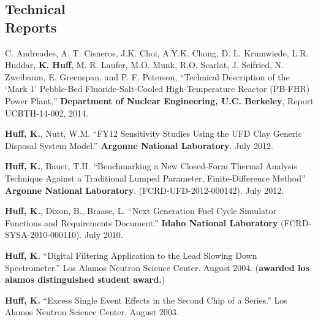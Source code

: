 \documentclass[margin,line]{resume}
\begin{document}
\begin{resume}
    \section{\mysidestyle Technical\\Reports}
    \begin{bibenum}
      \item C. Andreades, A. T. Cisneros, J.K. Choi, A.Y.K. Chong, D. L.
      Krumwiede, L.R. Huddar, \textbf{K. Huff}, M. R. Laufer, M.O. Munk, R.O.
      Scarlat, J. Seifried, N. Zweibaum, E. Greenspan, and P. F. Peterson,
      ``Technical Description of the ‘Mark 1’ Pebble-Bed Fluoride-Salt-Cooled
      High-Temperature Reactor (PB-FHR) Power Plant,'' \textbf{Department of Nuclear
      Engineering, U.C. Berkeley}, Report UCBTH-14-002, 2014.
      \item \textbf{Huff, K.}, Nutt, W.M. ``FY12 Sensitivity Studies Using the UFD Clay Generic Disposal System Model.''
        \textbf{Argonne National Laboratory}. July 2012.
      \item \textbf{Huff, K.}, Bauer, T.H. ``Benchmarking a New Closed-Form Thermal Analysis Technique Against a Traditional
        Lumped Parameter, Finite-Difference Method'' \textbf{Argonne National Laboratory}. (FCRD-UFD-2012-000142). July 2012.
      \item \textbf{Huff, K.}, Dixon, B., Braase, L. ``Next Generation Fuel Cycle Simulator Functions and Requirements Document.''
        \textbf{Idaho National Laboratory} (FCRD-SYSA-2010-000110). July 2010.
      \item \textbf{Huff, K.} ``Digital Filtering Application to the Lead Slowing Down
        Spectrometer.'' Los Alamos Neutron Science Center. August 2004.  %
        (\textbf{awarded los alamos distinguished student award.})
      \item \textbf{Huff, K.} ``Excess Single Event Effects in the Second Chip of a Series.''
        Los Alamos Neutron Science Center. August 2003.
    \end{bibenum}

\end{resume}
\end{document}
